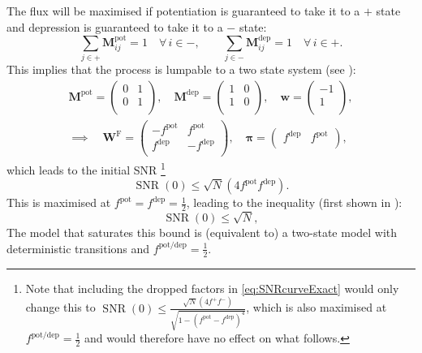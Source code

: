 \documentclass[12pt]{article}
\newcommand{\eqm}{\pi}
\newcommand{\eq}{\boldsymbol{\eqm}}
\newcommand{\wm}{w}
\newcommand{\w}{\mathbf{\wm}}
\newcommand{\Wm}{W}
\newcommand{\W}{\mathbf{\Wm}}
\newcommand{\MMdm}{M}
\newcommand{\MMd}{\mathbf{\MMdm}}
\newcommand{\frg}{\W^{\mathrm{F}}}
\newcommand{\pot}{^{\text{pot}}}
\newcommand{\dep}{^{\text{dep}}}
\newcommand{\potdep}{^{\text{pot/dep}}}
\DeclareMathOperator{\SNR}{SNR}
\DeclareMathOperator{\snr}{SNR}
\begin{document}
The flux will be maximised if potentiation is guaranteed to take it to a \(+\) state and depression is guaranteed to take it to a \(-\) state:
%
\begin{equation*}
  \sum_{j \in +} \MMd \pot_{ij} = 1 \quad \forall\, i \in -,
  \qquad
  \sum_{j \in -} \MMd \dep_{ij} = 1 \quad \forall\, i \in +.
\end{equation*}
%
This implies that the process is lumpable to a two state system (see \cite{kemeny1960finite,Ball1993Lumpability,burke1958markovian}):
%
\begin{multline}\label{eq:binarylump}
  \MMd \pot = \begin{pmatrix}
                0 & 1 \\
                0 & 1 \\
              \end{pmatrix}
  ,\quad
  \MMd \dep = \begin{pmatrix}
                1 & 0 \\
                1 & 0 \\
              \end{pmatrix}
  ,\quad
  \w = \begin{pmatrix}
           -1 \\
           1 \\
         \end{pmatrix}
  ,\\ \implies\quad
  \frg = \begin{pmatrix}
           -f\pot & f\pot \\
           f\dep & -f\dep \\
         \end{pmatrix}
  ,\quad
  \eq = \begin{pmatrix}
           f\dep & f\pot \\
         \end{pmatrix}
  ,
\end{multline}
%
which leads to the initial SNR%
\footnote{Note that including the dropped factors in \cref{eq:SNRcurveExact} would only change this to
\(\SNR(0) \leq \frac{\sqrt{N} (4f^+f^-)}{\sqrt{1 - (f\pot - f\dep)^4}}\),
which is also maximised at \(f\potdep = \frac{1}{2}\) and would therefore have no effect on what follows.}
%
\begin{equation}\label{eq:binarySNR}
  \SNR(0) \leq \sqrt{N} (4 f\pot f\dep) .
\end{equation}
%
This is maximised at \(f\pot = f\dep = \frac{1}{2}\),
leading to the inequality (first shown in \cite{Lahiri2013synapse}):
%
\begin{equation}\label{eq:initbnd}
  \snr(0) \leq \sqrt{N},
\end{equation}
%
The model that saturates this bound is (equivalent to) a two-state model with deterministic transitions and \(f\potdep=\frac{1}{2}\).
\end{document}
